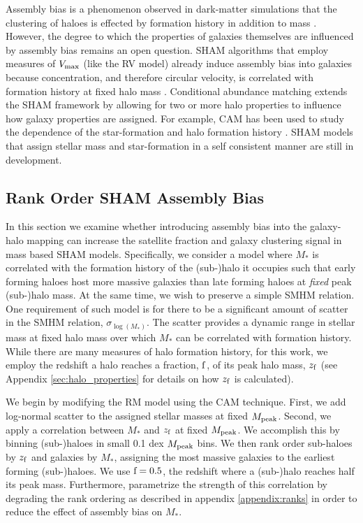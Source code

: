 \documentclass[a4paper,fleqn,usenatbib]{mnras}
\begin{document}
Assembly bias is a phenomenon observed in dark-matter simulations that the clustering of haloes is effected by formation history in addition to mass \citep{Gao:2005ds, Wechsler:2006rg, Gao:2007yy, li:2008oi, Sunayama:2015ue}.  However, the degree to which the properties of galaxies themselves are influenced by assembly bias remains an open question.  SHAM algorithms that employ measures of $V_{\rm max}$ (like the RV model) already induce assembly bias into galaxies because concentration, and therefore circular velocity, is correlated with formation history at fixed halo mass \citep{Zentner:2014ki}.  Conditional abundance matching \citep[CAM,][]{Hearin:2014hh} extends the SHAM framework by allowing for two or more halo properties to influence how galaxy properties are assigned.  For example, CAM has been used to study the dependence of the star-formation and halo formation history \citep{Hearin:2013km, Hearin:2014hh, Watson:2015gq, Saito:2015vi, Paranjape:2015uy}.  SHAM models that assign stellar mass and star-formation in a self consistent manner are still in development.

\subsection{Rank Order SHAM Assembly Bias}

In this section we examine whether introducing assembly bias into the galaxy-halo mapping can increase the satellite fraction and galaxy clustering signal in mass based SHAM models.  Specifically, we consider a model where $M_{*}$ is correlated with the formation history of the (sub-)halo it occupies such that early forming haloes host more massive galaxies than late forming haloes at {\em fixed} peak (sub-)halo mass.  At the same time, we wish to preserve a simple SMHM relation.  One requirement of such model is for there to be a significant amount of scatter in the SMHM relation, $\sigma_{\log(M_*)}$.  The scatter provides a dynamic range in stellar mass at fixed halo mass over which $M_*$ can be correlated with formation history.  While there are many measures of halo formation history, for this work, we employ the redshift a halo reaches a fraction, $\rm f$, of its peak halo mass, $z_{\rm f}$ (see Appendix \ref{sec:halo_properties} for details on how $z_{\rm f}$ is calculated).

We begin by modifying the RM model using the CAM technique.  First, we add log-normal scatter to the assigned stellar masses at fixed $M_{\rm peak}$.  Second, we apply a correlation between $M_{*}$ and $z_{\rm f}$ at fixed $M_{\rm peak}$.  We accomplish this by binning (sub-)haloes in small 0.1 dex $M_{\rm peak}$ bins.  We then rank order sub-haloes by $z_{\rm f}$ and galaxies by $M_{*}$, assigning the most massive galaxies to the earliest forming (sub-)haloes.  We use ${\rm f}=0.5$, the redshift where a (sub-)halo reaches half its peak mass.  Furthermore, parametrize the strength of this correlation by degrading the rank ordering as described in appendix \ref{appendix:ranks} in order to reduce the effect of assembly bias on $M_*$.
\end{document}
